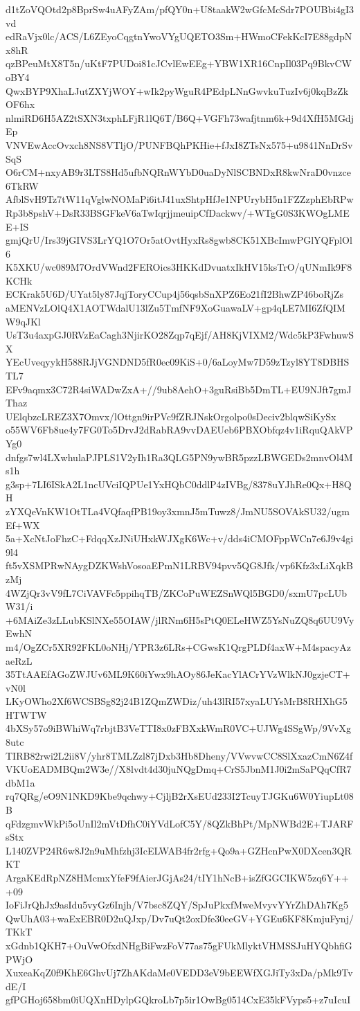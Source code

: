 d1tZoVQOtd2p8BprSw4uAFyZAm/pfQY0n+U8taakW2wGfcMcSdr7POUBbi4gI3vd
edRaVjx0lc/ACS/L6ZEyoCqgtnYwoVYgUQETO3Sm+HWmoCFekKcI7E88gdpNx8hR
qzBPeuMtX8T5n/uKtF7PUDoi81cJCvlEwEEg+YBW1XR16CnpIl03Pq9BkvCWoBY4
QwxBYP9XhaLJutZXYjWOY+wIk2pyWguR4PEdpLNnGwvkuTuzIv6j0kqBzZkOF6hx
nlmiRD6H5AZ2tSXN3txphLFjR1lQ6T/B6Q+VGFh73wafjtnm6k+9d4XfH5MGdjEp
VNVEwAccOvxch8NS8VTljO/PUNFBQhPKHie+fJxI8ZTsNx575+u9841NnDrSvSqS
O6rCM+nxyAB9r3LTS8Hd5ufbNQRnWYbD0uaDyNlSCBNDxR8kwNraD0vnzce6TkRW
AfblSvH9Tz7tW11qVglwNOMaPi6itJ41uxShtpHfJe1NPUrybH5n1FZZzphEbRPw
Rp3b8pshV+DsR33BSGFkeV6aTwIqrjjmeuipCfDackwv/+WTgG0S3KWOgLMEE+IS
gmjQrU/Irs39jGIVS3LrYQ1O7Or5atOvtHyxRs8gwb8CK51XBcImwPGlYQFplOl6
K5XKU/wc089M7OrdVWnd2FEROics3HKKdDvuatxIkHV15ksTrO/qUNmIk9F8KCHk
ECKrak5U6D/UYat5ly87JqjToryCCup4j56qsbSnXPZ6Eo21fI2BhwZP46boRjZs
aMENVzLOlQ4X1AOTWdalU13lZu5TmfNF9XoGuawaLV+gp4qLE7MI6ZfQIMW9qJKl
UsT3u4axpGJ0RVzEaCagh3NjirKO28Zqp7qEjf/AH8KjVIXM2/Wdc5kP3FwhuwSX
YEcUveqyykH588RJjVGNDND5fR0ec09KiS+0/6aLoyMw7D59zTzyl8YT8DBHSTL7
EFv9aqmx3C72R4siWADwZxA+//9ub8AehO+3guRsiBb5DmTL+EU9NJft7gmJThaz
UElqbzcLREZ3X7Omvx/lOttgn9irPVc9fZRJNskOrgolpo0sDeciv2blqwSiKySx
o55WV6Fb8ue4y7FG0To5DrvJ2dRabRA9vvDAEUeb6PBXObfqz4v1iRquQAkVPYg0
dnfgs7wl4LXwhulaPJPLS1V2yIh1Ra3QLG5PN9ywBR5pzzLBWGEDs2mnvOl4Ms1h
g3sp+7LI6ISkA2L1ncUVciIQPUe1YxHQbC0ddlP4zIVBg/8378uYJhRe0Qx+H8QH
zYXQeVnKW1OtTLa4VQfaqfPB19oy3xmnJ5mTuwz8/JmNU5SOVAkSU32/ugmEf+WX
5a+XcNtJoFhzC+FdqqXzJNiUHxkWJXgK6Wc+v/dds4iCMOFppWCn7e6J9v4gi9l4
ft5vXSMPRwNAygDZKWshVosoaEPmN1LRBV94pvv5QG8Jfk/vp6Kfz3xLiXqkBzMj
4WZjQr3vV9fL7CiVAVFc5ppihqTB/ZKCoPuWEZSnWQl5BGD0/sxmU7pcLUbW31/i
+6MAiZe3zLLubKSlNXe55OIAW/jlRNm6H5sPtQ0ELeHWZ5YsNuZQ8q6UU9VyEwhN
m4/OgZCr5XR92FKL0oNHj/YPR3z6LRs+CGwsK1QrgPLDf4axW+M4spacyAzaeRzL
35TtAAEfAGoZWJUv6ML9K60iYwx9hAOy86JeKacYlACrYVzWlkNJ0gzjeCT+vN0l
LKyOWho2Xf6WCSBSg82j24B1ZQmZWDiz/uh43lRI57xyaLUYsMrB8RHXhG5HTWTW
4bXSy57o9iBWhiWq7rbjtB3VeTTI8x0zFBXxkWmR0VC+UJWg4SSgWp/9VvXg8utc
TIRB82rwi2L2ii8V/yhr8TMLZzl87jDxb3Hb8Dheny/VVwvwCC8SlXxazCmN6Z4f
VKUoEADMBQm2W3e//X8lvdt4d30juNQgDmq+CrS5JbnM1J0i2mSaPQqCfR7dbM1a
rq7QRg/eO9N1NKD9Kbe9qchwy+CjljB2rXsEUd233I2TcuyTJGKu6W0YiupLt08B
qFdzgmvWkPi5oUnIl2mVtDfhC0iYVdLofC5Y/8QZkBhPt/MpNWBd2E+TJARFsStx
L140ZVP24R6w8J2n9uMhfzhj3IcELWAB4fr2rfg+Qo9a+GZHcnPwX0DXcen3QRKT
ArgaKEdRpNZ8HMcmxYfeF9fAierJGjAs24/tIY1hNcB+isZfGGCIKW5zq6Y+++09
IoFiJrQhJx9asIdu5vyGz6Injh/V7bsc8ZQY/SpJuPkxfMweMvyvYYrZhDAh7Kg5
QwUhA03+waExEBR0D2uQJxp/Dv7uQt2oxDfe30eeGV+YGEu6KF8KmjuFynj/TKkT
xGdnb1QKH7+OuVwOfxdNHgBiFwzFoV77as75gFUkMlyktVHMSSJuHYQbhfiGPWjO
XuxeaKqZ0f9KhE6GhvUj7ZhAKdaMe0VEDD3eV9bEEWfXGJiTy3xDa/pMk9TvdE/I
gfPGHoj658bm0iUQXnHDylpGQkroLb7p5ir1OwBg0514CxE35kFVyps5+z7uIcuI
